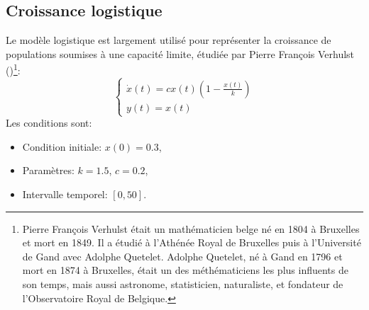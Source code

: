         \subsection{Croissance logistique}
            Le modèle logistique est largement utilisé pour représenter la croissance de populations soumises à une capacité limite, étudiée par Pierre François Verhulst (\cite{Verhulst1845, Verhulst1847})\footnote{Pierre François Verhulst était un mathématicien belge né en 1804 à Bruxelles et mort en 1849. Il a étudié à l'Athénée Royal de Bruxelles puis à l'Université de Gand avec Adolphe Quetelet. Adolphe Quetelet, né à Gand en 1796 et mort en 1874 à Bruxelles, était un des méthématiciens les plus influents de son temps, mais aussi astronome, statisticien, naturaliste, et fondateur de l'Observatoire Royal de Belgique.}:
            \begin{equation*}
            \begin{cases}
            \dot x(t)=c x(t)\left(1-\frac{x(t)}{k}\right)\\
            y(t)=x(t)
            \end{cases}
            \end{equation*}
            Les conditions sont:
            \begin{itemize}
                \item Condition initiale: $x(0)=0.3$,
                \item Paramètres: $k=1.5$, $c=0.2$,
                \item Intervalle temporel: $[0,50]$.
            \end{itemize}
        
